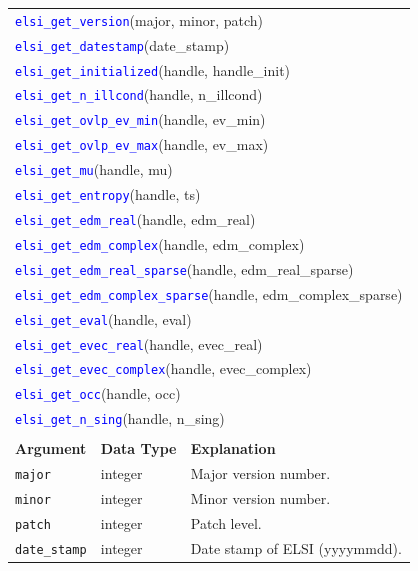 \documentclass{report}
\newcommand{\api}[1]{\textcolor{blue}{\texttt{#1}}}
\begin{document}
\begin{longtable}[]{|p{35mm}|p{40mm}|p{87mm}|}
\multicolumn{3}{l}{\api{elsi\_get\_version}(major, minor, patch)}\\
\multicolumn{3}{l}{\api{elsi\_get\_datestamp}(date\_stamp)}\\
\multicolumn{3}{l}{\api{elsi\_get\_initialized}(handle, handle\_init)}\\
\multicolumn{3}{l}{\api{elsi\_get\_n\_illcond}(handle, n\_illcond)}\\
\multicolumn{3}{l}{\api{elsi\_get\_ovlp\_ev\_min}(handle, ev\_min)}\\
\multicolumn{3}{l}{\api{elsi\_get\_ovlp\_ev\_max}(handle, ev\_max)}\\
\multicolumn{3}{l}{\api{elsi\_get\_mu}(handle, mu)}\\
\multicolumn{3}{l}{\api{elsi\_get\_entropy}(handle, ts)}\\
\multicolumn{3}{l}{\api{elsi\_get\_edm\_real}(handle, edm\_real)}\\
\multicolumn{3}{l}{\api{elsi\_get\_edm\_complex}(handle, edm\_complex)}\\
\multicolumn{3}{l}{\api{elsi\_get\_edm\_real\_sparse}(handle, edm\_real\_sparse)}\\
\multicolumn{3}{l}{\api{elsi\_get\_edm\_complex\_sparse}(handle, edm\_complex\_sparse)}\\
\multicolumn{3}{l}{\api{elsi\_get\_eval}(handle, eval)}\\
\multicolumn{3}{l}{\api{elsi\_get\_evec\_real}(handle, evec\_real)}\\
\multicolumn{3}{l}{\api{elsi\_get\_evec\_complex}(handle, evec\_complex)}\\
\multicolumn{3}{l}{\api{elsi\_get\_occ}(handle, occ)}\\
\multicolumn{3}{l}{\api{elsi\_get\_n\_sing}(handle, n\_sing)}\\
\multicolumn{3}{l}{}\\
\hline
\multicolumn{1}{|l|}{\textbf{Argument}} & \multicolumn{1}{l|}{\textbf{Data Type}} & \multicolumn{1}{l|}{\textbf{Explanation}}\\
\hline
\texttt{major}                & integer                 & Major version number.\\
\hline
\texttt{minor}                & integer                 & Minor version number.\\
\hline
\texttt{patch}                & integer                 & Patch level.\\
\hline
\texttt{date\_stamp}          & integer                 & Date stamp of ELSI (yyyymmdd).\\

\end{longtable}
\end{document}
